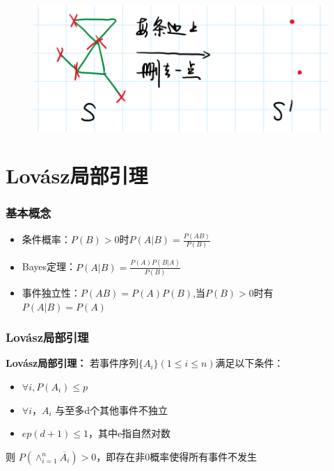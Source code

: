 \documentclass[AutoFakeBold]{beamer}
\begin{document}
{\begin{frame}
        \begin{figure}
            \centering
            \includegraphics[scale=.5]{figures/2.png}
        \end{figure}
    
    \end{frame}

    \section{Lovász局部引理}

    \begin{frame}
        \frametitle{基本概念}
    
        \begin{itemize}
            \item 条件概率：\(P(B)>0\)时$P(A|B)=\frac{P(AB)}{P(B)}$
            \item Bayes定理：$P(A|B) = \frac{P(A)P(B|A)}{P(B)}$
            \item 事件独立性：$P(AB)=P(A)P(B)$,当\(P(B)>0\)时有\(P(A|B) = P(A)\)
        \end{itemize}
    
    \end{frame}

    \begin{frame}
        \frametitle{Lovász局部引理}
    
        \textbf{Lovász局部引理：} 若事件序列$\{A_i\}(1 \le i \le n)$满足以下条件：
        \begin{itemize}
            \item $\forall i, P(A_i) \le p$
            \item $\forall i$，$A_i$ 与至多d个其他事件不独立
            \item $ep(d+1) \le 1$，其中e指自然对数
        \end{itemize}
        则 $P(\wedge_{i=1}^{n}\overline{A_i}) > 0$，即存在非0概率使得所有事件不发生
    

\end{frame}}
\end{document}
